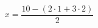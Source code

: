 \documentclass[11pt]{article}
\begin{document}
\[
x = \frac{10 - (2 \cdot 1 + 3 \cdot 2)}{2}
\]
\end{document}
